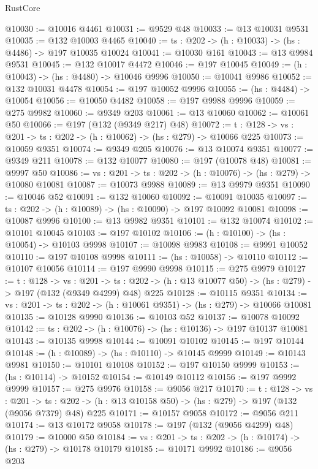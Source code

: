 \begin{lexlean}{RustCore}
\begin{coremodule}
@10030 := @10016 @4461
@10031 := @9529 @48
@10033 := @13 @10031 @9531
@10035 := @132 @10003 @4465
@10040 := {ts : @202} -> (h : @10033) -> (hs : @4486) -> @197 @10035 @10024
@10041 := @10030 @161
@10043 := @13 @9984 @9531
@10045 := @132 @10017 @4472
@10046 := @197 @10045
@10049 := (h : @10043) -> (hs : @4480) -> @10046 @9996
@10050 := @10041 @9986
@10052 := @132 @10031 @4478
@10054 := @197 @10052 @9996
@10055 := (hs : @4484) -> @10054
@10056 := @10050 @4482
@10058 := @197 @9988 @9996
@10059 := @275 @9982
@10060 := @9349 @203
@10061 := @13 @10060
@10062 := @10061 @50
@10066 := @197 (@132 (@9349 @217) @48)
@10072 := {t : @128} -> {vs : @201} -> {ts : @202} -> (h : @10062) -> (hs : @279) -> @10066 @225
@10073 := @10059 @9351
@10074 := @9349 @205
@10076 := @13 @10074 @9351
@10077 := @9349 @211
@10078 := @132 @10077
@10080 := @197 (@10078 @48)
@10081 := @9997 @50
@10086 := {vs : @201} -> {ts : @202} -> (h : @10076) -> (hs : @279) -> @10080 @10081
@10087 := @10073 @9988
@10089 := @13 @9979 @9351
@10090 := @10046 @52
@10091 := @132 @10060
@10092 := @10091 @10035
@10097 := {ts : @202} -> (h : @10089) -> (hs : @10090) -> @197 @10092 @10081
@10098 := @10087 @9996
@10100 := @13 @9982 @9351
@10101 := @132 @10074
@10102 := @10101 @10045
@10103 := @197 @10102
@10106 := (h : @10100) -> (hs : @10054) -> @10103 @9998
@10107 := @10098 @9983
@10108 := @9991 @10052
@10110 := @197 @10108 @9998
@10111 := (hs : @10058) -> @10110
@10112 := @10107 @10056
@10114 := @197 @9990 @9998
@10115 := @275 @9979
@10127 := {t : @128} ->
  {vs : @201} ->
  {ts : @202} -> (h : @13 @10077 @50) -> (hs : @279) -> @197 (@132 (@9349 @4299) @48) @225
@10128 := @10115 @9351
@10134 := {vs : @201} -> {ts : @202} -> (h : @10061 @9351) -> (hs : @279) -> @10066 @10081
@10135 := @10128 @9990
@10136 := @10103 @52
@10137 := @10078 @10092
@10142 := {ts : @202} -> (h : @10076) -> (hs : @10136) -> @197 @10137 @10081
@10143 := @10135 @9998
@10144 := @10091 @10102
@10145 := @197 @10144
@10148 := (h : @10089) -> (hs : @10110) -> @10145 @9999
@10149 := @10143 @9981
@10150 := @10101 @10108
@10152 := @197 @10150 @9999
@10153 := (hs : @10114) -> @10152
@10154 := @10149 @10112
@10156 := @197 @9992 @9999
@10157 := @275 @9976
@10158 := @9056 @217
@10170 := {t : @128} ->
  {vs : @201} ->
  {ts : @202} -> (h : @13 @10158 @50) -> (hs : @279) -> @197 (@132 (@9056 @7379) @48) @225
@10171 := @10157 @9058
@10172 := @9056 @211
@10174 := @13 @10172 @9058
@10178 := @197 (@132 (@9056 @4299) @48)
@10179 := @10000 @50
@10184 := {vs : @201} -> {ts : @202} -> (h : @10174) -> (hs : @279) -> @10178 @10179
@10185 := @10171 @9992
@10186 := @9056 @203

\end{coremodule}
\end{lexlean}
